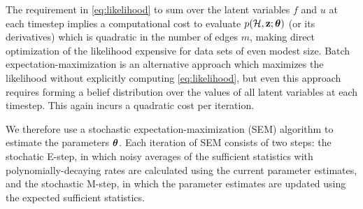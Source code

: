 \documentclass[aps,pre,reprint,superscriptaddress,nofootinbib]{revtex4-2}
\begin{document}
    The requirement in \cref{eq:likelihood} to sum over the latent variables $f$ and $u$ at each timestep implies a computational cost to evaluate $p(\mathcal{H}, \mathbf{z} ; \boldsymbol{\theta})$ (or its derivatives) which is quadratic in the number of edges $m$, making direct optimization of the likelihood expensive for data sets of even modest size. 
    Batch expectation-maximization \cite{dempster1977maximum}  is an alternative approach which maximizes the likelihood without explicitly computing \cref{eq:likelihood}, but even this approach requires forming a belief distribution over the values of all latent variables at each timestep. 
    This again incurs a quadratic cost per iteration. 
    
    We therefore use a stochastic expectation-maximization (SEM) algorithm \cite{cappeOnLineExpectationMaximization2009} to estimate the parameters $\boldsymbol{\theta}$.
    Each iteration of SEM consists of two steps: the stochatic E-step, in which noisy averages of the sufficient statistics with polynomially-decaying rates are calculated using the current parameter estimates, and the stochastic M-step, in which the parameter estimates are updated using the expected sufficient statistics. 
\end{document}
